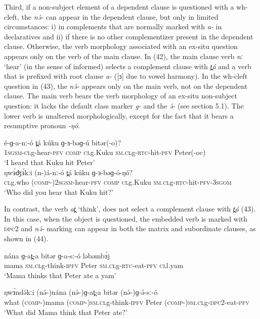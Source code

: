 Third, if a non-subject element of a dependent clause is questioned with a wh-cleft, the \textit{nə́-} can appear in the dependent clause, but only in limited circumstances: i) in complements that are normally marked with \textit{a-} in declaratives and ii) if there is no other complementizer present in the dependent clause. Otherwise, the verb morphology associated with an ex-situ question appears only on the verb of the main clause. In (42), the main clause verb \textit{nː} ‘hear’ (in the sense of informed) selects a complement clause with \textit{t̪á} and a verb that is prefixed with root clause \textit{a-} ([ɜ] due to vowel harmony). In the wh-cleft question in (43), the \textit{nə́-} appears only on the main verb, not on the dependent clause. The main verb bears the verb morphology of an ex-situ non-subject question: it lacks the default class marker \textit{g-} and the \textit{ə́-} (see section 5.1). The lower verb is unaltered morphologically, except for the fact that it bears a resumptive pronoun \textit{-ŋó}.

\ea
\ea \gll	é-ɡ-a-nː-ó	t̪á	kúku	ɡ-ɜ-bəɡ-ú	bitər(-o)? \\
   1\textsc{sgsm-cl}g-hear-\textsc{pfv}	\textsc{comp}	\textsc{cl}g.Kuku	\textsc{sm.cl}g-\textsc{rtc}-hit-\textsc{pfv}   	Peter(-oc)\\
\trans	‘I heard that Kuku hit Peter’\\
\ex \gll	ŋwɜ́ʤɜ́kːi	(n-)á-nː-ó	t̪á	kúku		ɡ-ɜ-bəɡ-ó-ŋó? \\
   \textsc{cl}g.who	(\textsc{comp-})2\textsc{sgsm}-hear-\textsc{pfv}	\textsc{comp} \textsc{cl}g.Kuku	\textsc{sm.cl}g-\textsc{rtc}-hit-\textsc{pfv}-3\textsc{sgom}\\
\trans	‘Who did you hear that Kuku hit?’\\
\z
\z

In contrast, the verb \textit{at̪} ‘think’, does not select a complement clause with \textit{t̪á} (43). In this case, when the object is questioned, the embedded verb is marked with \textsc{dpc}2 and \textit{nə́-} marking can appear in both the matrix and subordinate clauses, as shown in (44).

\ea
\gll	nána	ɡ-at̪-a	bitər	ɡ-a-sː-ó	ləbəmbɜ́j\\
mama	\textsc{sm.cl}g-think-\textsc{ipfv}	Peter	\textsc{sm.cl}g-\textsc{rtc}-eat-\textsc{pfv}	\textsc{cl}l.yam\\
\trans ‘Mama thinks that Peter ate a yam’\\
\z

\ea
\gll	ŋwɜ́ndə́kːi	(nə́-)nána	(nə́-)ɡ-at̪-a	bitər (nə́-)ɡ-ə́-sː-ó \\
what	(\textsc{comp-})mama	(\textsc{comp-})\textsc{sm.cl}g-think-\textsc{ipfv}	Peter (\textsc{comp-})\textsc{sm.cl}g-\textsc{dpc}2-eat-\textsc{pfv}\\
\trans ‘What did Mama think that Peter ate?’\\
\z

